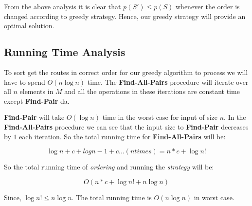 \documentclass[8pt]{article}
\begin{document}
From the above analysis it is clear that $p(S') \leq p(S)$ whenever the order is changed according to greedy strategy. Hence, our greedy strategy will provide an optimal solution.

\subsection{Running Time Analysis}
To sort get the routes in correct order for our greedy algorithm to process we will have to spend $O(n\log{n})$ time. The \textbf{Find-All-Pairs} procedure will iterate over all $n$ elements in $M$ and all the operations in these iterations are constant time except \textbf{Find-Pair} da.

\textbf{Find-Pair} will take $O(\log{n})$ time in the worst case for input of size $n$. In the \textbf{Find-All-Pairs} procedure we can see that the input size to \textbf{Find-Pair} decreases by $1$ each iteration. So the total running time for \textbf{Find-All-Pairs} will be:

$$\log{n} + c + log{n - 1} + c ...(n times) = n*c + \log{n!}$$

So the total running time of \textit{ordering} and running the \textit{strategy} will be:

$$O(n*c + \log{n!} + n\log{n})$$

Since, $\log{n!} \leq n\log{n}$. The total running time is $O(n\log{n})$ in worst case.
\end{document}
